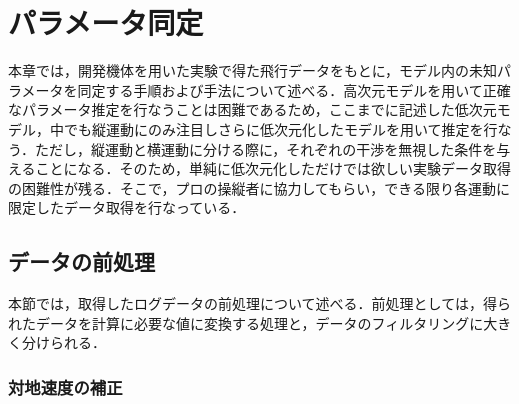 
\chapter{パラメータ同定}
\label{sys_id}

本章では，開発機体を用いた実験で得た飛行データをもとに，モデル内の未知パラメータを同定する手順および手法について述べる．高次元モデルを用いて正確なパラメータ推定を行なうことは困難であるため，ここまでに記述した低次元モデル，中でも縦運動にのみ注目しさらに低次元化したモデルを用いて推定を行なう．ただし，縦運動と横運動に分ける際に，それぞれの干渉を無視した条件を与えることになる．そのため，単純に低次元化しただけでは欲しい実験データ取得の困難性が残る．そこで，プロの操縦者に協力してもらい，できる限り各運動に限定したデータ取得を行なっている．\label{da}

\section{データの前処理}

本節では，取得したログデータの前処理について述べる．前処理としては，得られたデータを計算に必要な値に変換する処理と，データのフィルタリングに大きく分けられる．

\subsection{対地速度の補正}

